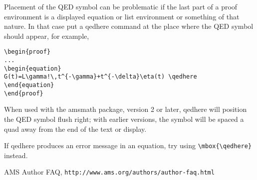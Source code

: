 \documentclass[twoside]{article}
\newcommand{\ntt}{%
  \fontfamily\ttdefault \fontseries\mddefault \fontshape\updefault
  \selectfont
}
\DeclareRobustCommand{\cn}[1]{{\ntt\bslchar#1}}
\DeclareRobustCommand{\pkg}[1]{{\ntt#1}}
\DeclareRobustCommand{\env}[1]{{\ntt#1}}
\begin{document}
Placement of the QED symbol can be problematic if the last part of
a \env{proof} environment is a displayed equation or list environment
or something of that nature. In that case put a \cn{qedhere} command at
the place where the QED symbol should appear, for example,
\begin{verbatim}
\begin{proof}
...
\begin{equation}
G(t)=L\gamma!\,t^{-\gamma}+t^{-\delta}\eta(t) \qedhere
\end{equation}
\end{proof}
\end{verbatim}
When used with the \pkg{amsmath} package, version 2 or later, \cn{qedhere}
will position the QED symbol flush right; with earlier versions, the
symbol will be spaced a quad away from the end of the text or display.

If \cn{qedhere} produces an error message in an equation, try using
\verb'\mbox{\qedhere}' instead.

\begin{thebibliography}{[AF]}

 AMS Author FAQ,
\texttt{http://www.ams.org/authors/author-faq.html}

\end{thebibliography}
\end{document}
